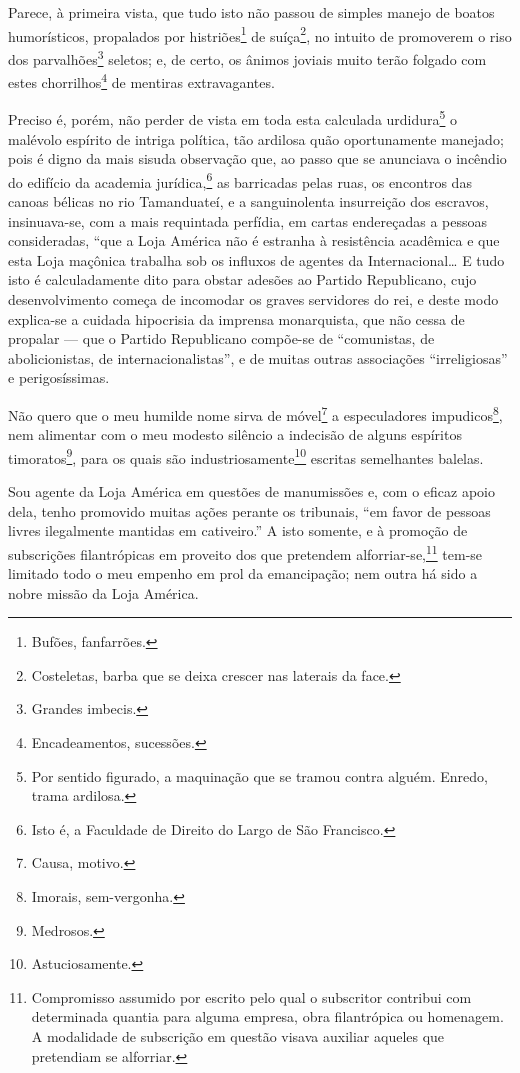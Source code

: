 Parece, à primeira vista, que tudo isto não passou de simples manejo de
boatos humorísticos, propalados por histriões\footnote{ Bufões,
  fanfarrões.} de suíça\footnote{ Costeletas, barba que se deixa
  crescer nas laterais da face.}, no intuito de promoverem o riso dos
parvalhões\footnote{ Grandes imbecis.} seletos; e, de certo, os ânimos
joviais muito terão folgado com estes chorrilhos\footnote{
  Encadeamentos, sucessões.} de mentiras extravagantes.

Preciso é, porém, não perder de vista em toda esta calculada
urdidura\footnote{ Por sentido figurado, a maquinação que se tramou
  contra alguém. Enredo, trama ardilosa.} o malévolo espírito de intriga
política, tão ardilosa quão oportunamente manejado; pois é digno da mais
sisuda observação que, ao passo que se anunciava o incêndio do edifício
da academia jurídica,\footnote{ Isto é, a Faculdade de Direito do Largo
  de São Francisco.} as barricadas pelas ruas, os encontros das canoas
bélicas no rio Tamanduateí, e a sanguinolenta insurreição dos escravos,
insinuava-se, com a mais requintada perfídia, em cartas endereçadas a
pessoas consideradas, ``que a Loja América não é estranha à resistência
acadêmica e que esta Loja maçônica trabalha sob os influxos de agentes
da Internacional\ldots{} E tudo isto é calculadamente dito para obstar
adesões ao Partido Republicano, cujo desenvolvimento começa de incomodar
os graves servidores do rei, e deste modo explica-se a cuidada
hipocrisia da imprensa monarquista, que não cessa de propalar --- que o
Partido Republicano compõe-se de ``comunistas, de abolicionistas, de
internacionalistas'', e de muitas outras associações ``irreligiosas'' e
perigosíssimas.

Não quero que o meu humilde nome sirva de móvel\footnote{ Causa,
  motivo.} a especuladores impudicos\footnote{ Imorais, sem-vergonha.},
nem alimentar com o meu modesto silêncio a indecisão de alguns espíritos
timoratos\footnote{ Medrosos.}, para os quais são
industriosamente\footnote{ Astuciosamente.} escritas semelhantes
balelas.

Sou agente da Loja América em questões de manumissões e, com o eficaz
apoio dela, tenho promovido muitas ações perante os tribunais, ``em favor
de pessoas livres ilegalmente mantidas em cativeiro.'' A isto somente, e
à promoção de subscrições filantrópicas em proveito dos que pretendem
alforriar-se,\footnote{ Compromisso assumido por escrito pelo qual o
  subscritor contribui com determinada quantia para alguma empresa, obra
  filantrópica ou homenagem. A modalidade de subscrição em questão
  visava auxiliar aqueles que pretendiam se alforriar.} tem-se limitado
todo o meu empenho em prol da emancipação; nem outra há sido a nobre
missão da Loja América.


